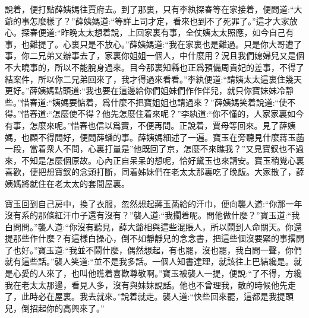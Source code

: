 \begin{parag}
    說着，便打點薛姨媽往賈府去。到了那裏，只有李紈探春等在家接着，便問道:“大爺的事怎麼樣了？”薛姨媽道:“等詳上司才定，看來也到不了死罪了。”這才大家放心。探春便道:“昨晚太太想着說，上回家裏有事，全仗姨太太照應，如今自己有事，也難提了。心裏只是不放心。”薛姨媽道:“我在家裏也是難過。只是你大哥遭了事，你二兄弟又辦事去了，家裏你姐姐一個人，中什麼用？況且我們媳婦兒又是個不大曉事的，所以不能脫身過來。目今那裏知縣也正爲預備周貴妃的差事，不得了結案件，所以你二兄弟回來了，我才得過來看看。”李紈便道:“請姨太太這裏住幾天更好。”薛姨媽點頭道:“我也要在這邊給你們姐妹們作作伴兒，就只你寶妹妹冷靜些。”惜春道:“姨媽要惦着，爲什麼不把寶姐姐也請過來？”薛姨媽笑着說道:“使不得。”惜春道:“怎麼使不得？他先怎麼住着來呢？”李紈道:“你不懂的，人家家裏如今有事，怎麼來呢。”惜春也信以爲實，不便再問。正說着，賈母等回來。見了薛姨媽，也顧不得問好，便問薛蟠的事。薛姨媽細述了一遍。寶玉在旁聽見什麼蔣玉菡一段，當着衆人不問，心裏打量是”他既回了京，怎麼不來瞧我？”又見寶釵也不過來，不知是怎麼個原故。心內正自呆呆的想呢，恰好黛玉也來請安。寶玉稍覺心裏喜歡，便把想寶釵的念頭打斷，同着姊妹們在老太太那裏吃了晚飯。大家散了，薛姨媽將就住在老太太的套間屋裏。
\end{parag}


\begin{parag}
    寶玉回到自己房中，換了衣服，忽然想起蔣玉菡給的汗巾，便向襲人道:“你那一年沒有系的那條紅汗巾子還有沒有？”襲人道:“我擱着呢。問他做什麼？”寶玉道:“我白問問。”襲人道:“你沒有聽見，薛大爺相與這些混賬人，所以鬧到人命關天。你還提那些作什麼？有這樣白操心，倒不如靜靜兒的念念書，把這些個沒要緊的事撂開了也好。”寶玉道:“我並不鬧什麼，偶然想起，有也罷，沒也罷，我白問一聲，你們就有這些話。”襲人笑道:“並不是我多話。一個人知書達理，就該往上巴結纔是。就是心愛的人來了，也叫他瞧着喜歡尊敬啊。”寶玉被襲人一提，便說:“了不得，方纔我在老太太那邊，看見人多，沒有與妹妹說話。他也不曾理我，散的時候他先走了，此時必在屋裏。我去就來。”說着就走。襲人道:“快些回來罷，這都是我提頭兒，倒招起你的高興來了。”
\end{parag}


